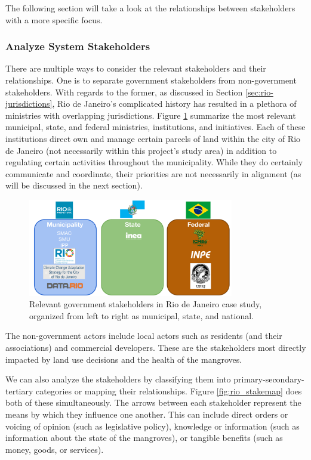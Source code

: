 The following section will take a look at the relationships between stakeholders with a more specific focus.

\subsubsection{Analyze System Stakeholders}

There are multiple ways to consider the relevant stakeholders and their relationships. One is to separate government stakeholders from non-government stakeholders. With regards to the former, as discussed in Section \ref{sec:rio-jurisdictions}, Rio de Janeiro's complicated history has resulted in a plethora of ministries with overlapping jurisdictions. Figure \ref{fig:government-agencies} summarize the most relevant municipal, state, and federal ministries, institutions, and initiatives. Each of these institutions direct own and manage certain parcels of land within the city of Rio de Janeiro (not necessarily within this project's study area) in addition to regulating certain activities throughout the municipality. While they do certainly communicate and coordinate, their priorities are not necessarily in alignment (as will be discussed in the next section). 


\begin{figure}[!htb] 
\centering
\includegraphics[width=0.8\textwidth]{Figures/chap4/government-agencies.png}
\caption[Relevant government stakeholders in Rio de Janeiro case study]{Relevant government stakeholders in Rio de Janeiro case study, organized from left to right as municipal, state, and national.}
\label{fig:government-agencies}
\end{figure}

The non-government actors include local actors such as residents (and their associations) and commercial developers. These are the stakeholders most directly impacted by land use decisions and the health of the mangroves.

We can also analyze the stakeholders by classifying them into primary-secondary-tertiary categories or mapping their relationships. Figure \ref{fig:rio_stakemap} does both of these simultaneously. The arrows between each stakeholder represent the means by which they influence one another. This can include direct orders or voicing of opinion (such as legislative policy), knowledge or information (such as information about the state of the mangroves), or tangible benefits (such as money, goods, or services).

